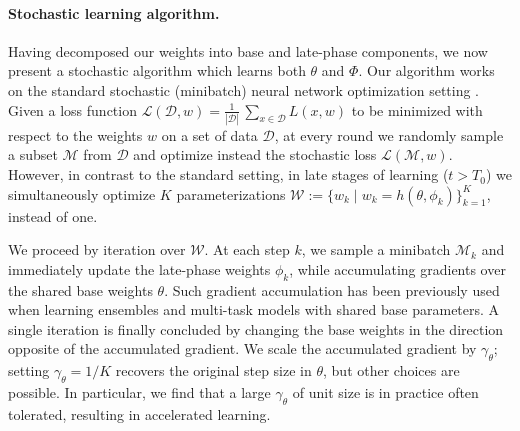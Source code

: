 \documentclass{article} \usepackage{iclr2021_conference,times}
\begin{document}
\paragraph{Stochastic learning algorithm.} Having decomposed our weights into base and late-phase components, we now present a stochastic algorithm which learns both $\theta$ and $\Phi$. Our algorithm works on the standard stochastic (minibatch) neural network optimization setting \citep{bottou_large-scale_2010}. Given a loss function $\mathcal{L}(\mathcal{D}, w)=\frac{1}{|\mathcal{D}|} \, \sum_{x \in \mathcal{D}}L(x, w)$ to be minimized with respect to the weights $w$ on a set of data $\mathcal{D}$, at every round we randomly sample a subset $\mathcal{M}$ from $\mathcal{D}$ and optimize instead the stochastic loss $\mathcal{L}(\mathcal{M},w)$. However, in contrast to the standard setting, in late stages of learning ($t>T_0$) we simultaneously optimize $K$ parameterizations $\mathcal{W} := \{w_k \mid w_k = h(\theta, \phi_k)\}_{k=1}^K$, instead of one.

We proceed by iteration over $\mathcal{W}$. At each step $k$, we sample a minibatch $\mathcal{M}_k$ and immediately update the late-phase weights $\phi_k$, while accumulating gradients over the shared base weights $\theta$. Such gradient accumulation has been previously used when learning ensembles \citep{lee_why_2015,wen_batchensemble_2020} and multi-task models \citep{rebuffi_learning_2017} with shared base parameters. A single iteration is finally concluded by changing the base weights in the direction opposite of the accumulated gradient. We scale the accumulated gradient by $\gamma_\theta$; setting $\gamma_\theta = 1/K$ recovers the original step size in $\theta$, but other choices are possible. In particular, we find that a large $\gamma_\theta$ of unit size is in practice often tolerated, resulting in accelerated learning.
\end{document}
